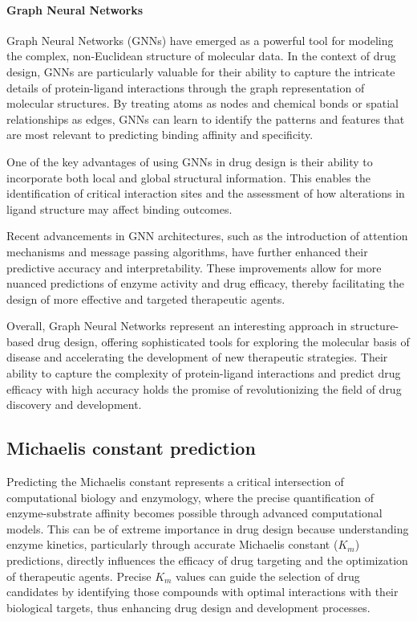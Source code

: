 \paragraph{Graph Neural Networks}
Graph Neural Networks (GNNs) have emerged as a powerful tool for modeling the complex, non-Euclidean structure of molecular data. In the context of drug design, GNNs are particularly valuable for their ability to capture the intricate details of protein-ligand interactions through the graph representation of molecular structures. By treating atoms as nodes and chemical bonds or spatial relationships as edges, GNNs can learn to identify the patterns and features that are most relevant to predicting binding affinity and specificity. \cite{ZHOU202057,Zhang2019GraphConv,graphreview}

One of the key advantages of using GNNs in drug design is their ability to incorporate both local and global structural information. This enables the identification of critical interaction sites and the assessment of how alterations in ligand structure may affect binding outcomes. \cite{ijcai2018p468,Stokes2020AntibioticDiscovery}

Recent advancements in GNN architectures, such as the introduction of attention mechanisms and message passing algorithms, have further enhanced their predictive accuracy and interpretability. These improvements allow for more nuanced predictions of enzyme activity and drug efficacy, thereby facilitating the design of more effective and targeted therapeutic agents. \cite{Gilmer2017NeuralMessage,Xiong2020GraphAttention}

Overall, Graph Neural Networks represent an interesting approach in structure-based drug design, offering sophisticated tools for exploring the molecular basis of disease and accelerating the development of new therapeutic strategies. Their ability to capture the complexity of protein-ligand interactions and predict drug efficacy with high accuracy holds the promise of revolutionizing the field of drug discovery and development.


\subsection{Michaelis constant prediction}

Predicting the Michaelis constant represents a critical intersection of computational biology 
and enzymology, where the precise quantification of enzyme-substrate affinity becomes possible 
through advanced computational models. This can be of extreme importance in drug design because understanding enzyme kinetics, particularly through accurate Michaelis constant ($K_m$) predictions, directly influences the efficacy of drug targeting and the optimization of therapeutic agents. Precise $K_m$ values can guide the selection of drug candidates by identifying those compounds with optimal interactions with their biological targets, thus enhancing drug design and development processes.

